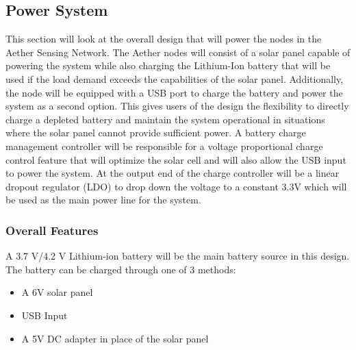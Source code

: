\subsection{Power System}
This section will look at the overall design that will power the nodes in the Aether Sensing Network. The Aether nodes will consist of a solar panel capable of powering the system while also charging the Lithium-Ion battery that will be used if the load demand exceeds the capabilities of the solar panel. Additionally, the node will be equipped with a USB port to charge the battery and power the system as a second option. This gives users of the design the flexibility to directly charge a depleted battery and maintain the system operational in situations where the solar panel cannot provide sufficient power. A battery charge management controller will be responsible for a voltage proportional charge control feature that will optimize the solar cell and will also allow the USB input to power the system. At the output end of the charge controller will be a linear dropout regulator (LDO) to drop down the voltage to a constant 3.3V which will be used as the main power line for the system.

\subsubsection{Overall Features}
A 3.7 V/4.2 V Lithium-ion battery will be the main battery source in this design. The battery can be charged through one of 3 methods:
\begin{itemize}
    \item A 6V solar panel
    \item USB Input
    \item A 5V DC adapter in place of the solar panel
\end{itemize}

